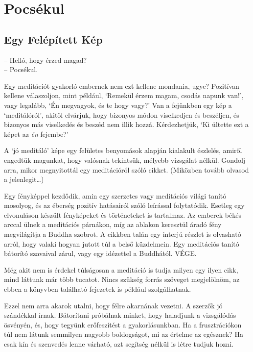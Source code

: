 \chapter{Pocsékul}

\section{Egy Felépített Kép}


\noindent -- Helló, hogy érzed magad?\\
-- Pocsékul.

Egy meditációt gyakorló embernek nem ezt kellene mondania, ugye?
Pozitívan kellene válaszoljon, mint például, `Remekül érzem magam,
csodás napunk van!', vagy legalább, `Én megvagyok, és te hogy vagy?' Van
a fejünkben egy kép a `meditálóról', akitől elvárjuk, hogy bizonyos
módon viselkedjen és beszéljen, és bizonyos más viselkedés és beszéd nem
illik hozzá. Kérdezhetjük, `Ki ültette ezt a képet az \emph{én}
fejembe?'

A `jó meditáló' képe egy felületes benyomások alapján kialakult
észlelés, amiről engedtük magunkat, hogy valósnak tekintsük, mélyebb
vizsgálat nélkül. Gondolj arra, mikor megnyitottál egy meditációról
szóló cikket. (Miközben tovább olvasod a jelenlegit\ldots)

Egy fényképpel kezdődik, amin egy szerzetes vagy meditációs világi
tanító mosolyog, és az éberség pozitív hatásairól szóló leírással
folytatódik. Esetleg egy elvonuláson készült fényképeket és történeteket
is tartalmaz. Az emberek békés arccal ülnek a meditációs párnákon, míg
az ablakon keresztül áradó fény megvilágítja a Buddha szobrot. A cikkben
talán egy interjú részlet is olvasható arról, hogy valaki hogyan jutott
túl a belső küzdelmein. Egy meditációs tanító bátorító szavaival zárul,
vagy egy idézettel a Buddhától. VÉGE.

Még akit nem is érdekel túlságosan a meditáció is tudja milyen egy ilyen
cikk, mind láttunk már több tucatot. Nincs szükség forrás szöveget
megjelölnöm, az ebben a könyvben található fejezetek is például
szolgálhatnak.

Ezzel nem arra akarok utalni, hogy félre akarnának vezetni. A szerzők jó
szándékkal írnak. Bátorítani próbálnak minket, hogy haladjunk a
vizsgálódás ösvényén, és, hogy tegyünk erőfeszítést a gyakorlásunkban.
Ha a frusztrációkon túl nem látunk semmilyen nagyobb boldogságot, mi az
értelme az egésznek? Ha csak kín és szenvedés lenne várható, azt
segítség nélkül is létre tudjuk hozni.

